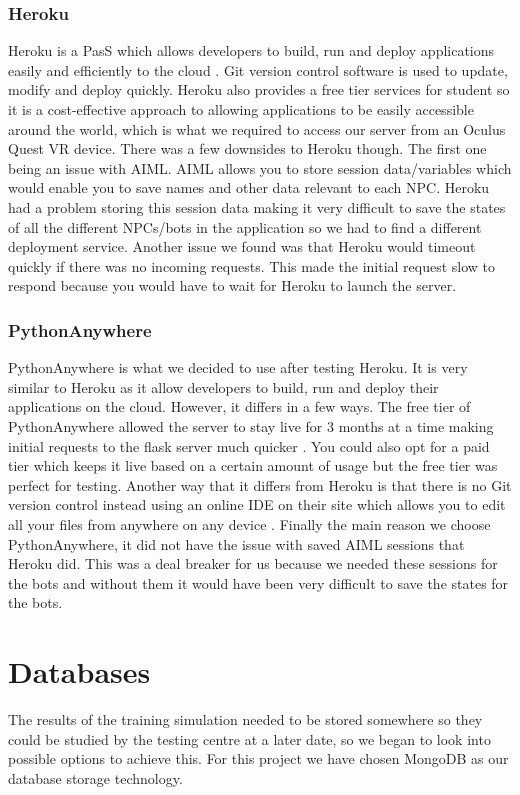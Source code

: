 \subsubsection{Heroku}
Heroku is a PasS which allows developers to build, run and deploy applications easily and efficiently to the cloud \cite{heroku}. Git version control software is used to update, modify and deploy quickly. Heroku also provides a free tier services for student so it is a cost-effective approach to allowing applications to be easily accessible around the world, which is what we required to access our server from an Oculus Quest VR device. There was a few downsides to Heroku though. The first one being an issue with AIML. AIML allows you to store session data/variables which would enable you to save names and other data relevant to each NPC. Heroku had a problem storing this session data making it very difficult to save the states of all the different NPCs/bots in the application so we had to find a different deployment service. Another issue we found was that Heroku would timeout quickly if there was no incoming requests. This made the initial request slow to respond because you would have to wait for Heroku to launch the server.

\subsubsection{PythonAnywhere}
PythonAnywhere is what we decided to use after testing Heroku. It is very similar to Heroku as it allow developers to build, run and deploy their applications on the cloud. However, it differs in a few ways. The free tier of PythonAnywhere allowed the server to stay live for 3 months at a time making initial requests to the flask server much quicker \cite{pythonanywhere}. You could also opt for a paid tier which keeps it live based on a certain amount of usage but the free tier was perfect for testing. Another way that it differs from Heroku is that there is no Git version control instead using an online IDE on their site which allows you to edit all your files from anywhere on any device \cite{pythonanywhere}. Finally the main reason we choose PythonAnywhere, it did not have the issue with saved AIML sessions that Heroku did. This was a deal breaker for us because we needed these sessions for the bots and without them it would have been very difficult to save the states for the bots. 

\section{Databases}
The results of the training simulation needed to be stored somewhere so they could be studied by the testing centre at a later date, so we began to look into possible options to achieve this. For this project we have chosen MongoDB as our database storage technology.

